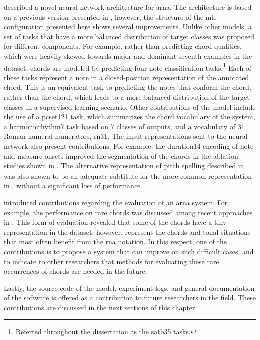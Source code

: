  described a novel neural network
architecture for \gls{arna}. The architecture is based on a
previous version presented in
\textcite{napoleslopez2021augmentednet}, however, the
structure of the \gls{mtl} configuration presented here
shows several improvements. Unlike other models, a set of
tasks that have a more balanced distribution of target
classes was proposed for different components. For example,
rather than predicting chord qualities, which were heavily
skewed towards major and dominant seventh examples in the
dataset, chords are modeled by predicting four note
classification tasks.\footnote{Referred throughout the
dissertation as the \gls{satb35} tasks.} Each of these tasks
represent a note in a \gls{closed-position} representation
of the annotated chord. This is an equivalent task to
predicting the notes that conform the chord, rather than the
chord, which leads to a more balanced distribution of the
target classes in a supervised learning scenario. Other
contributions of the model include the use of a
\gls{pcset121} task, which summarizes the chord vocabulary
of the system, a \gls{harmonicrhythm7} task based on 7
classes of outputs, and a vocabulary of 31 Roman numeral
numerators, \gls{rn31}. The input representations sent to
the neural network also present contributions. For example,
the \gls{duration14} encoding of note and measure onsets
improved the segmentation of the chords in the ablation
studies shown in .
The alternative representation of pitch spelling described
in  was also shown to be an
adequate subtitute for the more common representation in
, without a significant loss
of performance.

 introduced contributions
regarding the evaluation of an \gls{arna} system. For
example, the performance on rare chords was discussed among
recent approaches in . This
form of evaluation revealed that some of the chords have a
tiny representation in the dataset, however, represent the
chords and tonal situations that most often benefit from the
\gls{rna} notation. In this respect, one of the
contributions is to propose a system that can improve on
such difficult cases, and to indicate to other researchers
that methods for evaluating these rare occurrences of chords
are needed in the future.

Lastly, the source code of the model, experiment logs, and
general documentation of the software is offered as a
contribution to future researchers in the field. These
contributions are discussed in the next sections of this
chapter.
